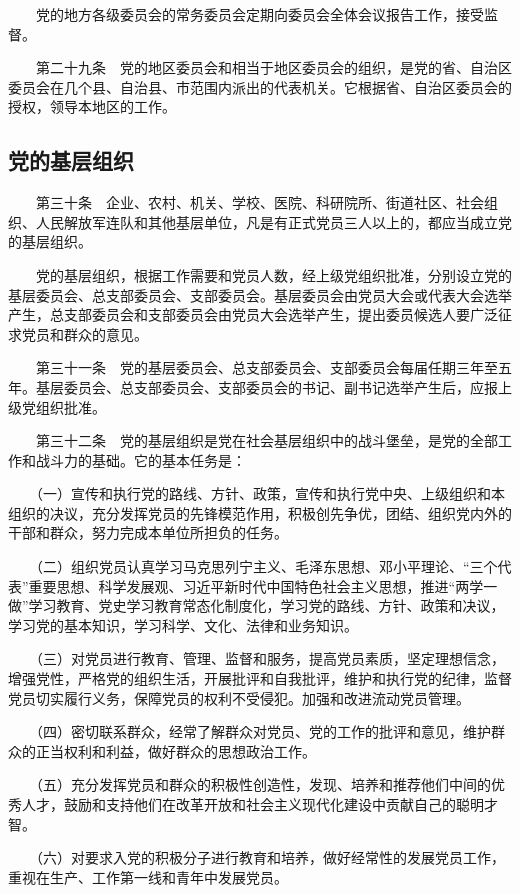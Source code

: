 　　党的地方各级委员会的常务委员会定期向委员会全体会议报告工作，接受监督。

　　第二十九条　党的地区委员会和相当于地区委员会的组织，是党的省、自治区委员会在几个县、自治县、市范围内派出的代表机关。它根据省、自治区委员会的授权，领导本地区的工作。

    \subsection{党的基层组织}
　　第三十条　企业、农村、机关、学校、医院、科研院所、街道社区、社会组织、人民解放军连队和其他基层单位，凡是有正式党员三人以上的，都应当成立党的基层组织。

　　党的基层组织，根据工作需要和党员人数，经上级党组织批准，分别设立党的基层委员会、总支部委员会、支部委员会。基层委员会由党员大会或代表大会选举产生，总支部委员会和支部委员会由党员大会选举产生，提出委员候选人要广泛征求党员和群众的意见。

　　第三十一条　党的基层委员会、总支部委员会、支部委员会每届任期三年至五年。基层委员会、总支部委员会、支部委员会的书记、副书记选举产生后，应报上级党组织批准。

　　第三十二条　党的基层组织是党在社会基层组织中的战斗堡垒，是党的全部工作和战斗力的基础。它的基本任务是：

　　（一）宣传和执行党的路线、方针、政策，宣传和执行党中央、上级组织和本组织的决议，充分发挥党员的先锋模范作用，积极创先争优，团结、组织党内外的干部和群众，努力完成本单位所担负的任务。

　　（二）组织党员认真学习马克思列宁主义、毛泽东思想、邓小平理论、“三个代表”重要思想、科学发展观、习近平新时代中国特色社会主义思想，推进“两学一做”学习教育、党史学习教育常态化制度化，学习党的路线、方针、政策和决议，学习党的基本知识，学习科学、文化、法律和业务知识。

　　（三）对党员进行教育、管理、监督和服务，提高党员素质，坚定理想信念，增强党性，严格党的组织生活，开展批评和自我批评，维护和执行党的纪律，监督党员切实履行义务，保障党员的权利不受侵犯。加强和改进流动党员管理。

　　（四）密切联系群众，经常了解群众对党员、党的工作的批评和意见，维护群众的正当权利和利益，做好群众的思想政治工作。

　　（五）充分发挥党员和群众的积极性创造性，发现、培养和推荐他们中间的优秀人才，鼓励和支持他们在改革开放和社会主义现代化建设中贡献自己的聪明才智。

　　（六）对要求入党的积极分子进行教育和培养，做好经常性的发展党员工作，重视在生产、工作第一线和青年中发展党员。

